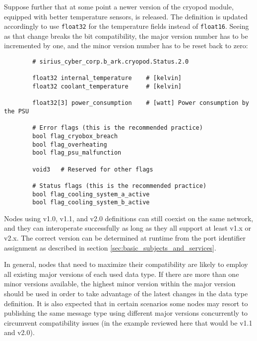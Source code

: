 \begin{remark}[breakable]
    Suppose further that at some point a newer version of the cryopod module,
    equipped with better temperature sensors, is released.
    The definition is updated accordingly to use \verb|float32| for the temperature fields instead of \verb|float16|.
    Seeing as that change breaks the bit compatibility,
    the major version number has to be incremented by one,
    and the minor version number has to be reset back to zero:

    \begin{verbatim}
        # sirius_cyber_corp.b_ark.cryopod.Status.2.0

        float32 internal_temperature    # [kelvin]
        float32 coolant_temperature     # [kelvin]

        float32[3] power_consumption    # [watt] Power consumption by the PSU

        # Error flags (this is the recommended practice)
        bool flag_cryobox_breach
        bool flag_overheating
        bool flag_psu_malfunction

        void3   # Reserved for other flags

        # Status flags (this is the recommended practice)
        bool flag_cooling_system_a_active
        bool flag_cooling_system_b_active
    \end{verbatim}

    Nodes using v1.0, v1.1, and v2.0 definitions can still coexist on the same network,
    and they can interoperate successfully as long as they all support at least v1.x or v2.x.
    The correct version can be determined at runtime from the port identifier assignment as described in section
    \ref{sec:basic_subjects_and_services}.

    In general, nodes that need to maximize their compatibility are likely to employ all existing major versions of
    each used data type.
    If there are more than one minor versions available, the highest minor version within the major version should
    be used in order to take advantage of the latest changes in the data type definition.
    It is also expected that in certain scenarios some nodes may resort to publishing the same message type
    using different major versions concurrently to circumvent compatibility issues
    (in the example reviewed here that would be v1.1 and v2.0).
\end{remark}

